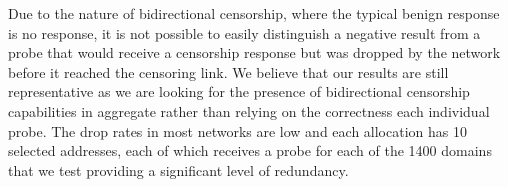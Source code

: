 Due to the nature of bidirectional censorship, where the typical benign response
is no response, it is not possible to easily distinguish a negative result from
a probe that would receive a censorship response but was dropped by the network
before it reached the censoring link. We believe that our results are still
representative as we are looking for the presence of bidirectional censorship
capabilities in aggregate rather than relying on the correctness each individual
probe. The drop rates in most networks are low and each allocation has 10
selected addresses, each of which receives a probe for each of the 1400 domains
that we test providing a significant level of redundancy.



